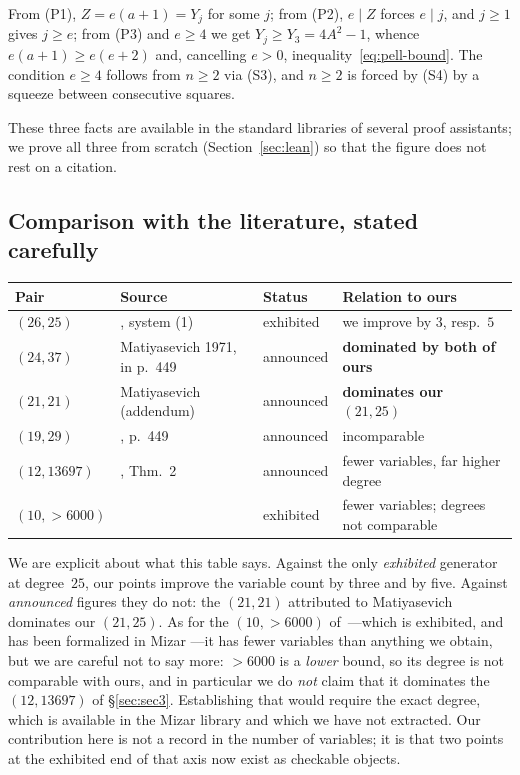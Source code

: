 From (P1), $Z=e(a+1)=Y_j$ for some $j$; from (P2), $e\mid Z$ forces $e\mid j$,
and $j\ge1$ gives $j\ge e$; from (P3) and $e\ge4$ we get
$Y_j\ge Y_3=4A^2-1$, whence $e(a+1)\ge e(e+2)$ and, cancelling $e>0$,
inequality~\eqref{eq:pell-bound}. The condition $e\ge4$ follows from $n\ge2$ via \textup{(S3)}, and $n\ge2$ is
forced by \textup{(S4)} by a squeeze between consecutive squares.

These three facts are available in the standard libraries of several proof
assistants; we prove all three from scratch (Section~\ref{sec:lean}) so that the
figure does not rest on a citation.

\subsection{Comparison with the literature, stated carefully}

\begin{center}
\begin{tabular}{@{}llll@{}}
\toprule
\textbf{Pair} & \textbf{Source} & \textbf{Status} & \textbf{Relation to ours} \\
\midrule
$(26,25)$ & \cite{jsww1976}, system (1) & exhibited & we improve by $3$, resp.\ $5$ \\
$(24,37)$ & Matiyasevich 1971, in \cite{jsww1976} p.~449 & announced & \textbf{dominated by both of ours} \\
$(21,21)$ & Matiyasevich (addendum) & announced & \textbf{dominates our $(21,25)$} \\
$(19,29)$ & \cite{jsww1976}, p.~449 & announced & incomparable \\
$(12,13697)$ & \cite{jsww1976}, Thm.~2 & announced & fewer variables, far higher degree \\
$(10,>6000)$ & \cite{matiyasevich1981} & exhibited & fewer variables; degrees not comparable \\
\bottomrule
\end{tabular}
\end{center}

We are explicit about what this table says. Against the only \emph{exhibited}
generator at degree~$25$, our points improve the variable count by three and by
five. Against \emph{announced} figures they do not: the $(21,21)$ attributed to
Matiyasevich dominates our $(21,25)$. As for the $(10,>6000)$
of~\cite{matiyasevich1981}---which is exhibited, and has been formalized in
Mizar \cite{pak2022ten}---it has fewer variables than anything we obtain, but
we are careful not to say more: $>6000$ is a \emph{lower} bound, so its degree
is not comparable with ours, and in particular we do \emph{not} claim that it
dominates the $(12,13697)$ of \S\ref{sec:sec3}. Establishing that would require
the exact degree, which is available in the Mizar library and which we have not
extracted. Our contribution here is not a record in the number of variables; it
is that two points at the exhibited end of that axis now exist as checkable
objects.
